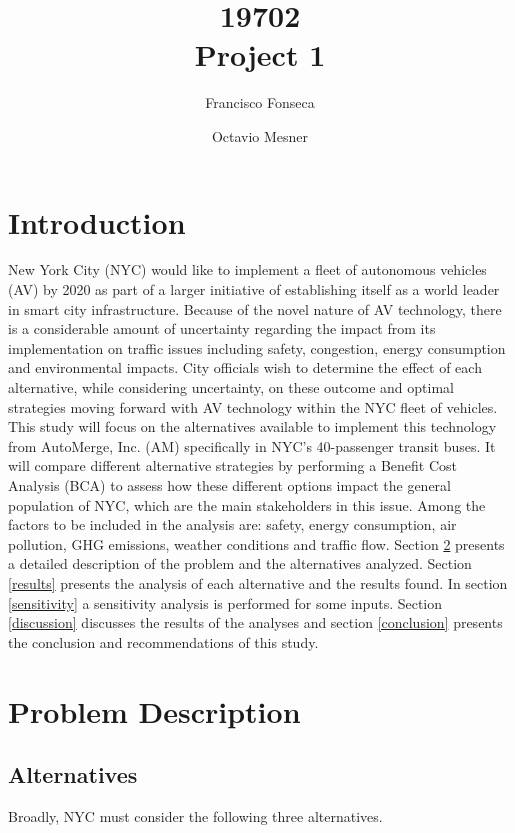 \documentclass[11pt, letterpaper]{article}
\title{\vspace{-2cm} 19702 \\ Project 1}
\author{Francisco Fonseca \and Octavio Mesner}
\date{\mydate}
\date{\mydateformat\normalsize\mydate} %
\begin{document}
\maketitle %

\section{Introduction} \label{intro}

New York City (NYC) would like to implement a fleet of autonomous
vehicles (AV) by 2020 as part of a larger initiative of establishing
itself as a world leader in smart city infrastructure. Because of the
novel nature of AV technology, there is a considerable amount of
uncertainty regarding the impact from its implementation on traffic
issues including
safety, congestion, energy consumption and environmental impacts.
City officials wish to determine the effect of each alternative, while
considering uncertainty, on these outcome
and optimal strategies moving forward with AV
technology within the NYC fleet of vehicles. This study will focus on
the alternatives available to implement  this technology
from AutoMerge, Inc. (AM) specifically in NYC's 40-passenger transit
buses. It will compare different alternative strategies by performing
a Benefit Cost Analysis (BCA) to assess how these different options
impact the general population of NYC, which are the main stakeholders
in this issue. Among the factors to be included in the analysis are:
safety, energy consumption, air pollution, GHG emissions, weather
conditions and traffic flow. Section \ref{problem} presents a detailed
description of the problem and the alternatives analyzed. Section
\ref{results} presents the analysis of each alternative and the
results found. In section \ref{sensitivity} a sensitivity analysis is
performed for some inputs. Section \ref{discussion} discusses the
results of the analyses and section \ref{conclusion} presents the
conclusion and recommendations of this study.

\section{Problem Description} \label{problem}
\subsection{Alternatives}

Broadly, NYC must consider the following three alternatives.
\end{document}
